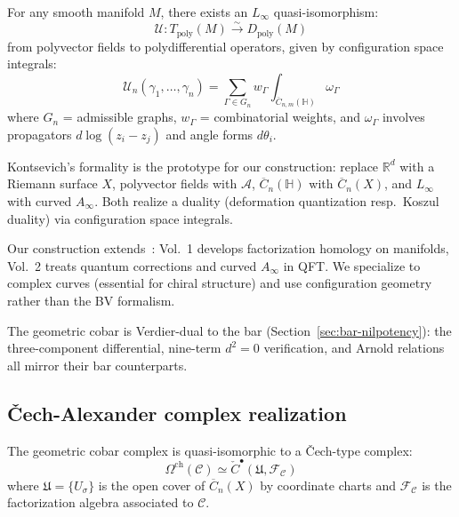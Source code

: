 \begin{theorem}\label{thm:kontsevich-formality}
\cite{Kon99} For any smooth manifold $M$, there exists an $L_\infty$ 
quasi-isomorphism:
\[\mathcal{U}: T_{\text{poly}}(M) \xrightarrow{\sim} D_{\text{poly}}(M)\]
from polyvector fields to polydifferential operators, given by configuration space integrals:
\[\mathcal{U}_n(\gamma_1, \ldots, \gamma_n) = \sum_{\Gamma \in G_n} w_\Gamma 
\int_{\overline{C}_{n,m}(\mathbb{H})} \omega_\Gamma\]
where $G_n$ = admissible graphs, $w_\Gamma$ = combinatorial weights, and 
$\omega_\Gamma$ involves propagators $d\log(z_i - z_j)$ and angle forms $d\theta_i$.
\end{theorem}

\begin{remark}\label{rem:kontsevich-chiral}
Kontsevich's formality is the prototype for our construction: replace $\mathbb{R}^d$ with a Riemann surface $X$, polyvector fields with $\mathcal{A}$, $\overline{C}_n(\mathbb{H})$ with $\overline{C}_n(X)$, and $L_\infty$ with curved $A_\infty$.  Both realize a duality (deformation quantization resp.\ Koszul duality) via configuration space integrals.
\end{remark}

\begin{remark}\label{rem:CG-factorization-detailed}
Our construction extends~\cite{CG17}: Vol.~1 develops factorization homology on manifolds, Vol.~2 treats quantum corrections and curved $A_\infty$ in QFT.  We specialize to complex curves (essential for chiral structure) and use configuration geometry rather than the BV formalism.
\end{remark}

\begin{remark}
The geometric cobar is Verdier-dual to the bar (Section~\ref{sec:bar-nilpotency}): the three-component differential, nine-term $d^2 = 0$ verification, and Arnold relations all mirror their bar counterparts.
\end{remark}

\subsection{Čech-Alexander complex realization}

\begin{theorem}\label{thm:cobar-cech}
The geometric cobar complex is quasi-isomorphic to a Čech-type complex:
\[
\Omega^{\text{ch}}(\mathcal{C}) \simeq \check{C}^{\bullet}(\mathfrak{U}, \mathcal{F}_{\mathcal{C}})
\]
where $\mathfrak{U} = \{U_{\sigma}\}$ is the open cover of $\overline{C}_n(X)$ by coordinate charts and $\mathcal{F}_{\mathcal{C}}$ is the factorization algebra associated to $\mathcal{C}$.
\end{theorem}

